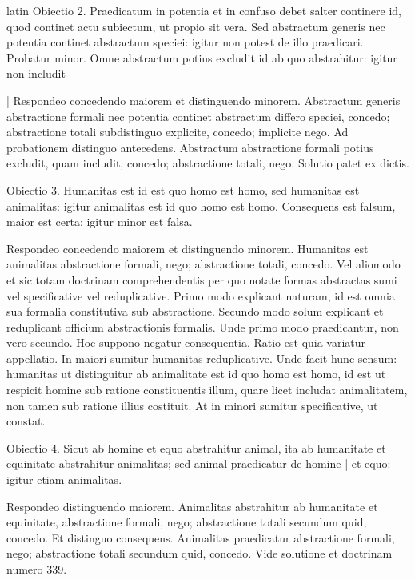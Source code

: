 \begin{otherlanguage*}{latin}
\pstart
Obiectio 2. Praedicatum in potentia et in confuso debet salter continere id, quod continet actu subiectum, ut propio sit vera. Sed abstractum generis nec potentia continet abstractum speciei:
igitur non potest de illo praedicari. Probatur minor. Omne abstractum potius excludit id ab quo abstrahitur:
igitur non includit 
\pend

\pstart
\textnormal{|} Respondeo concedendo maiorem et distinguendo minorem. Abstractum generis abstractione formali nec potentia continet abstractum differo speciei, concedo; abstractione totali subdistinguo explicite, concedo; implicite nego. Ad probationem distinguo antecedens. Abstractum abstractione formali potius excludit, quam includit, concedo; abstractione totali, nego. Solutio patet ex dictis. 
\pend

\pstart
Obiectio 3. Humanitas est id est quo homo est homo, sed humanitas est animalitas:
igitur animalitas est id quo homo est homo. Consequens est falsum, maior est certa:
igitur minor est falsa. 
\pend

\pstart
Respondeo concedendo maiorem et distinguendo minorem. Humanitas est animalitas abstractione formali, nego; abstractione totali, concedo. Vel aliomodo et sic totam doctrinam comprehendentis per quo notate formas abstractas sumi vel specificative vel reduplicative. Primo modo explicant naturam, id est omnia sua formalia constitutiva sub abstractione. Secundo modo solum explicant et reduplicant officium abstractionis formalis. Unde primo modo praedicantur, non vero secundo. Hoc suppono negatur consequentia. Ratio est quia variatur appellatio. In maiori sumitur humanitas reduplicative. Unde facit hunc sensum:
humanitas ut distinguitur ab animalitate est id quo homo est homo, id est ut respicit homine sub ratione constituentis illum, quare licet includat animalitatem, non tamen sub ratione illius costituit. At in minori sumitur specificative, ut constat. 
\pend

\pstart
Obiectio 4. Sicut ab homine et equo abstrahitur animal, ita ab humanitate et equinitate abstrahitur animalitas; sed animal praedicatur de homine \textnormal{|} et equo:
igitur etiam animalitas. 
\pend

\pstart
Respondeo distinguendo maiorem. Animalitas abstrahitur ab humanitate et equinitate, abstractione formali, nego; abstractione totali secundum quid, concedo. Et distinguo consequens. Animalitas praedicatur abstractione formali, nego; abstractione totali secundum quid, concedo. Vide solutione et doctrinam numero 339. 
\pend


\end{otherlanguage*}
